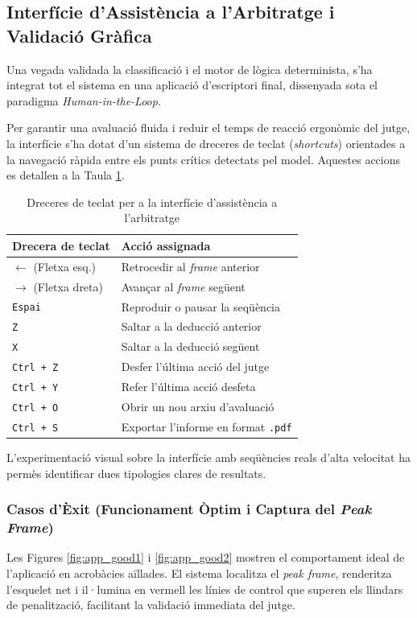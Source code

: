 \documentclass[10pt,a4paper,twocolumn,twoside]{article}
\begin{document}
\subsection{Interfície d'Assistència a l'Arbitratge i Validació Gràfica}
Una vegada validada la classificació i el motor de lògica determinista, s'ha integrat tot el sistema en una aplicació d'escriptori final, dissenyada sota el paradigma \textit{Human-in-the-Loop}. 

Per garantir una avaluació fluida i reduir el temps de reacció ergonòmic del jutge, la interfície s'ha dotat d'un sistema de dreceres de teclat (\textit{shortcuts}) orientades a la navegació ràpida entre els punts crítics detectats pel model. Aquestes accions es detallen a la Taula \ref{tab:shortcuts_app}.

\begin{table}[H]
\centering
\caption{Dreceres de teclat per a la interfície d'assistència a l'arbitratge}
\label{tab:shortcuts_app}
\renewcommand{\arraystretch}{1.25}
\begin{tabular}{ll}
\hline
\textbf{Drecera de teclat} & \textbf{Acció assignada} \\ \hline
\texttt{$\leftarrow$} (Fletxa esq.) & Retrocedir al \textit{frame} anterior \\
\texttt{$\rightarrow$} (Fletxa dreta) & Avançar al \textit{frame} següent \\
\texttt{Espai} & Reproduir o pausar la seqüència \\ \hline
\texttt{Z} & Saltar a la deducció anterior \\
\texttt{X} & Saltar a la deducció següent \\ \hline
\texttt{Ctrl + Z} & Desfer l'última acció del jutge \\
\texttt{Ctrl + Y} & Refer l'última acció desfeta \\
\texttt{Ctrl + O} & Obrir un nou arxiu d'avaluació \\
\texttt{Ctrl + S} & Exportar l'informe en format \texttt{.pdf} \\ \hline
\end{tabular}
\end{table}

L'experimentació visual sobre la interfície amb seqüències reals d'alta velocitat ha permès identificar dues tipologies clares de resultats.

\subsubsection{Casos d'Èxit (Funcionament Òptim i Captura del \textit{Peak Frame})}
Les Figures \ref{fig:app_good1} i \ref{fig:app_good2} mostren el comportament ideal de l'aplicació en acrobàcies aïllades. El sistema localitza el \textit{peak frame}, renderitza l'esquelet net i il·lumina en vermell les línies de control que superen els llindars de penalització, facilitant la validació immediata del jutge.
\end{document}
